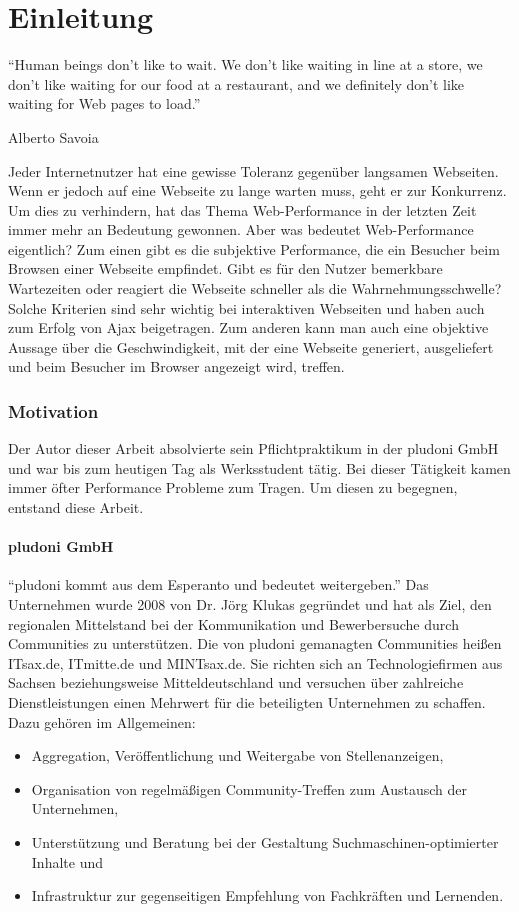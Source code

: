 \part{Einleitung}
\epigraph{``Human beings don’t like to wait. We don’t like waiting in line at a store, we don’t like waiting for our food at a restaurant, and we definitely don’t like waiting for Web pages to load.''}{Alberto Savoia}

Jeder Internetnutzer hat eine gewisse Toleranz gegenüber langsamen Webseiten. Wenn er jedoch auf eine Webseite zu lange warten muss, geht er zur Konkurrenz\citep{websiteoptimization2008}. Um dies zu verhindern, hat das Thema Web-Performance in der letzten Zeit immer mehr an Bedeutung gewonnen. Aber was bedeutet Web-Performance eigentlich? Zum einen gibt es die subjektive Performance, die ein Besucher beim Browsen einer Webseite empfindet. Gibt es für den Nutzer bemerkbare Wartezeiten oder reagiert die Webseite schneller als die Wahrnehmungsschwelle? Solche Kriterien sind sehr wichtig bei interaktiven Webseiten und haben auch zum Erfolg von Ajax beigetragen. Zum anderen kann man auch eine objektive Aussage über die Geschwindigkeit, mit der eine Webseite generiert, ausgeliefert und beim Besucher im Browser angezeigt wird, treffen. 
\label{sec:intro}
\section{Motivation}
Der Autor dieser Arbeit absolvierte sein Pflichtpraktikum in der pludoni GmbH und war bis zum heutigen Tag als Werksstudent tätig. Bei dieser T\"atigkeit kamen immer \"ofter Performance Probleme zum Tragen. Um diesen zu begegnen, entstand diese Arbeit.
\subsection{pludoni GmbH}
“pludoni kommt aus dem Esperanto und bedeutet weitergeben.” \citep{Klukas2011}
Das Unternehmen wurde 2008 von Dr. Jörg Klukas gegründet und hat als Ziel, den regionalen Mittelstand bei der Kommunikation und Bewerbersuche durch Communities zu unterstützen. Die von pludoni gemanagten Communities heißen ITsax.de, ITmitte.de und MINTsax.de. Sie richten sich an Technologiefirmen aus Sachsen beziehungsweise Mitteldeutschland und versuchen über zahlreiche Dienstleistungen einen Mehrwert für die beteiligten Unternehmen zu schaffen. Dazu geh\"oren im Allgemeinen:

\begin{itemize}
 \item Aggregation, Veröffentlichung und Weitergabe von Stellenanzeigen,
 \item Organisation von regelmäßigen Community-Treffen zum Austausch der Unternehmen,
 \item Unterstützung und Beratung bei der Gestaltung Suchmaschinen-optimierter Inhalte und
 \item Infrastruktur zur gegenseitigen Empfehlung von Fachkräften und Lernenden.
\end{itemize}


